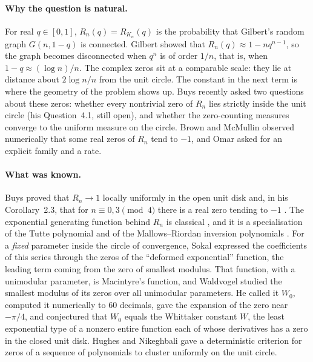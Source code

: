 \documentclass[11pt,a4paper]{article}
\theoremstyle{remark}
\begin{document}
\paragraph{Why the question is natural.} For real $q\in[0,1]$, $R_n(q)=R_{K_n}(q)$ is the probability that Gilbert's random graph $G(n,1-q)$ \cite{Gilbert} is connected. Gilbert \cite{Gilbert} showed that $R_n(q)\approx1-nq^{n-1}$, so the graph becomes disconnected when $q^{n}$ is of order $1/n$, that is, when $1-q\approx(\log n)/n$. The complex zeros sit at a comparable scale: they lie at distance about $2\log n/n$ from the unit circle. The constant in the next term is where the geometry of the problem shows up. Buys \cite{Buys} recently asked two questions about these zeros: whether every nontrivial zero of $R_n$ lies strictly inside the unit circle (his Question~4.1, still open), and whether the zero-counting measures converge to the uniform measure on the circle. Brown and McMullin \cite{BM} observed numerically that some real zeros of $R_n$ tend to $-1$, and Omar \cite{Omar} asked for an explicit family and a rate.

\paragraph{What was known.} Buys proved that $R_n\to1$ locally uniformly in the open unit disk and, in his Corollary~2.3, that for $n\equiv0,3\pmod4$ there is a real zero tending to $-1$ \cite{Buys}. The exponential generating function behind $R_n$ is classical \cite{Gilbert,SS}, and it is a specialisation of the Tutte polynomial and of the Mallows--Riordan inversion polynomials \cite{ABRS}. For a \emph{fixed} parameter inside the circle of convergence, Sokal \cite[slide~5]{Sokal} expressed the coefficients of this series through the zeros of the ``deformed exponential'' function, the leading term coming from the zero of smallest modulus. That function, with a unimodular parameter, is Macintyre's function, and Waldvogel \cite{Wald} studied the smallest modulus of its zeros over all unimodular parameters. He called it $W_0$, computed it numerically to 60 decimals, gave the expansion of the zero near $-\pi/4$, and conjectured that $W_0$ equals the Whittaker constant $W$, the least exponential type of a nonzero entire function each of whose derivatives has a zero in the closed unit disk. Hughes and Nikeghbali \cite{HN} gave a deterministic criterion for zeros of a sequence of polynomials to cluster uniformly on the unit circle.
\end{document}
